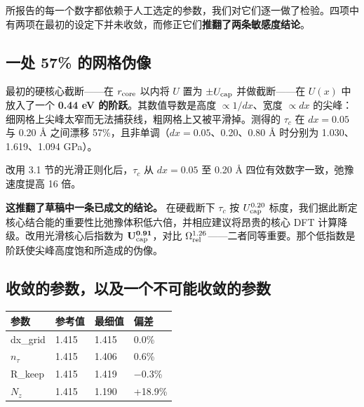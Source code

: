所报告的每一个数字都依赖于人工选定的参数，我们对它们逐一做了检验。四项中有两项在最初的设定下并未收敛，而修正它们\textbf{推翻了两条敏感度结论}。

\hypertarget{ux4e00ux5904-57-ux7684ux7f51ux683cux4f2aux50cf}{%
\subsection{一处 57\% 的网格伪像}\label{sec:ux4e00ux5904-57-ux7684ux7f51ux683cux4f2aux50cf}}

最初的硬核心截断------在 \(r_{\rm core}\) 以内将 \(U\) 置为 \(\pm U_{\rm cap}\) 并做截断------在 \(U(x)\) 中放入了一个 \textbf{0.44 eV 的阶跃}。其数值导数是高度 \(\propto1/dx\)、宽度 \(\propto dx\) 的尖峰：细网格上尖峰太窄而无法捕获线，粗网格上又被平滑掉。测得的 \(\tau_c\) 在 \(dx = 0.05\) 与 0.20 Å 之间漂移 57\%，且非单调（\(dx = 0.05\)、0.20、0.80 Å 时分别为 1.030、1.619、1.094 GPa）。

改用 3.1 节的光滑正则化后，\(\tau_c\) 从 \(dx = 0.05\) 至 0.20 Å 四位有效数字一致，弛豫速度提高 16 倍。

\textbf{这推翻了草稿中一条已成文的结论。} 在硬截断下 \(\tau_c\) 按 \(U_{\rm cap}^{0.20}\) 标度，我们据此断定核心结合能的重要性比弛豫体积低六倍，并相应建议将昂贵的核心 DFT 计算降级。改用光滑核心后指数为 \(\mathbf{U_{\rm cap}^{0.91}}\)，对比 \(\Omega_{\rm rel}^{1.26}\)------二者同等重要。那个低指数是阶跃使尖峰高度饱和所造成的伪像。

\hypertarget{ux6536ux655bux7684ux53c2ux6570ux4ee5ux53caux4e00ux4e2aux4e0dux53efux80fdux6536ux655bux7684ux53c2ux6570}{%
\subsection{收敛的参数，以及一个不可能收敛的参数}\label{sec:ux6536ux655bux7684ux53c2ux6570ux4ee5ux53caux4e00ux4e2aux4e0dux53efux80fdux6536ux655bux7684ux53c2ux6570}}

\begin{longtable}[]{@{}llll@{}}
\toprule\noalign{}
参数 & 参考值 & 最细值 & 偏差 \\
\midrule\noalign{}
\endhead
\bottomrule\noalign{}
\endlastfoot
dx\_grid & 1.415 & 1.415 & 0.0\% \\
\(n_\tau\) & 1.415 & 1.406 & 0.6\% \\
R\_keep & 1.415 & 1.419 & −0.3\% \\
\(N_z\) & 1.415 & 1.190 & +18.9\% \\
\end{longtable}


